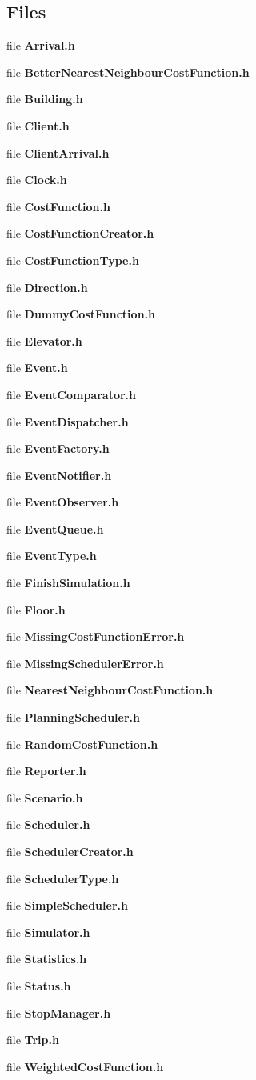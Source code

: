 \subsection*{Files}
\begin{DoxyCompactItemize}
\item 
file {\bf Arrival.\+h}
\item 
file {\bf Better\+Nearest\+Neighbour\+Cost\+Function.\+h}
\item 
file {\bf Building.\+h}
\item 
file {\bf Client.\+h}
\item 
file {\bf Client\+Arrival.\+h}
\item 
file {\bf Clock.\+h}
\item 
file {\bf Cost\+Function.\+h}
\item 
file {\bf Cost\+Function\+Creator.\+h}
\item 
file {\bf Cost\+Function\+Type.\+h}
\item 
file {\bf Direction.\+h}
\item 
file {\bf Dummy\+Cost\+Function.\+h}
\item 
file {\bf Elevator.\+h}
\item 
file {\bf Event.\+h}
\item 
file {\bf Event\+Comparator.\+h}
\item 
file {\bf Event\+Dispatcher.\+h}
\item 
file {\bf Event\+Factory.\+h}
\item 
file {\bf Event\+Notifier.\+h}
\item 
file {\bf Event\+Observer.\+h}
\item 
file {\bf Event\+Queue.\+h}
\item 
file {\bf Event\+Type.\+h}
\item 
file {\bf Finish\+Simulation.\+h}
\item 
file {\bf Floor.\+h}
\item 
file {\bf Missing\+Cost\+Function\+Error.\+h}
\item 
file {\bf Missing\+Scheduler\+Error.\+h}
\item 
file {\bf Nearest\+Neighbour\+Cost\+Function.\+h}
\item 
file {\bf Planning\+Scheduler.\+h}
\item 
file {\bf Random\+Cost\+Function.\+h}
\item 
file {\bf Reporter.\+h}
\item 
file {\bf Scenario.\+h}
\item 
file {\bf Scheduler.\+h}
\item 
file {\bf Scheduler\+Creator.\+h}
\item 
file {\bf Scheduler\+Type.\+h}
\item 
file {\bf Simple\+Scheduler.\+h}
\item 
file {\bf Simulator.\+h}
\item 
file {\bf Statistics.\+h}
\item 
file {\bf Status.\+h}
\item 
file {\bf Stop\+Manager.\+h}
\item 
file {\bf Trip.\+h}
\item 
file {\bf Weighted\+Cost\+Function.\+h}
\end{DoxyCompactItemize}
